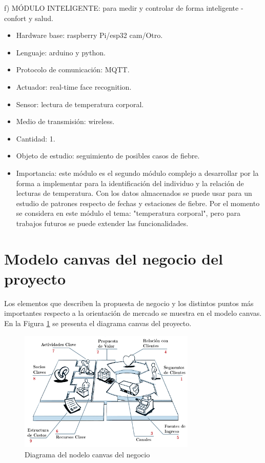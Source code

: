 \documentclass[11pt]{charter}
\begin{document}
f) MÓDULO INTELIGENTE: para medir y controlar de forma inteligente - confort y salud.
\begin{itemize}
\item Hardware base: raspberry Pi/esp32 cam/Otro.
\item Lenguaje: arduino y python.
\item Protocolo de comunicación: MQTT.
\item Actuador: real-time face recognition.
\item Sensor: lectura de temperatura corporal.
\item Medio de transmisión: wireless.
\item Cantidad: 1.
\item Objeto de estudio: seguimiento de posibles casos de fiebre.
\item Importancia: este módulo es el segundo módulo complejo a desarrollar por la forma a implementar para la identificación del individuo y la relación de lecturas de temperatura. Con los datos almacenados se puede usar para un estudio de patrones respecto de fechas y estaciones de fiebre. Por el momento se considera en este módulo el tema: "temperatura corporal", pero para trabajos futuros se puede extender las funcionalidades.
\end{itemize}

\section{Modelo canvas del negocio del proyecto}

Los elementos que describen la propuesta de negocio y los distintos puntos más importantes respecto a la orientación de mercado se muestra en el modelo canvas. En la Figura \ref{fig:diagCanvas} se presenta el diagrama canvas del proyecto. 

\vspace{15px}

\begin{figure}[htpb]
\centering 
\includegraphics[width=0.75\textwidth]{./Figuras/diagCanvas.png}
\caption{Diagrama del nodelo canvas del negocio}
\label{fig:diagCanvas}
\end{figure}
\end{document}
